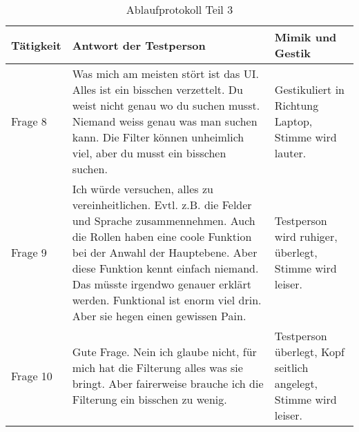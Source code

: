 \begin{table}[h!]
   \begin{tabular}{|L{0.3\textwidth}|L{0.4\textwidth}|L{0.2\textwidth}|}
       \hline
       \color{white}Tätigkeit & \color{white} Antwort der Testperson & \color{white} Mimik und Gestik \\
       \hline
       Frage 8 & Was mich am meisten stört ist das UI. Alles ist ein bisschen verzettelt. Du weist nicht genau wo du suchen musst. Niemand weiss genau
       was man suchen kann. Die Filter können unheimlich viel, aber du musst ein bisschen suchen. & Gestikuliert in Richtung Laptop, Stimme wird lauter. \\
       \hline
       Frage 9 & Ich würde versuchen, alles zu vereinheitlichen. Evtl. z.B. die Felder und Sprache zusammennehmen. Auch die Rollen
       haben eine coole Funktion bei der Anwahl der Hauptebene. Aber diese Funktion kennt einfach niemand. Das müsste irgendwo genauer erklärt werden.
       Funktional ist enorm viel drin. Aber sie hegen einen gewissen Pain. & Testperson wird ruhiger, überlegt, Stimme wird leiser. \\
       \hline
       Frage 10 & Gute Frage. Nein ich glaube nicht, für mich hat die Filterung alles was sie bringt. Aber fairerweise brauche ich die Filterung
       ein bisschen zu wenig. & Testperson überlegt, Kopf seitlich angelegt, Stimme wird leiser. \\
     \hline
     \end{tabular}
     \caption{Ablaufprotokoll Teil 3}
\end{table}

\newpage

